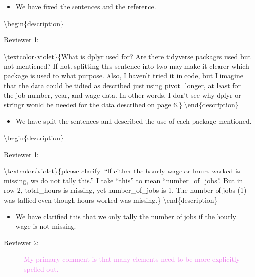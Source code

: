 \documentclass[12pt,a4paper,]{article}
\providecommand{\tightlist}{%
  \setlength{\itemsep}{0pt}\setlength{\parskip}{0pt}}
\begin{document}
\begin{itemize}
\tightlist
\item
  We have fixed the sentences and the reference.
\end{itemize}

\textbackslash begin\{description\}

\item[Reviewer 1:]

\textbackslash textcolor\{violet\}\{What is dplyr used for? Are there tidyverse packages used but not mentioned? If not, splitting this sentence into two may make it clearer which package is used to what purpose. Also, I haven't tried it in code, but I imagine that the data could be tidied as described just using pivot\_longer, at least for the job number, year, and wage data. In other words, I don't see why dplyr or stringr would be needed for the data described on page 6.\}
\textbackslash end\{description\}

\begin{itemize}
\tightlist
\item
  We have split the sentences and described the use of each package mentioned.
\end{itemize}

\textbackslash begin\{description\}

\item[Reviewer 1:]

\textbackslash textcolor\{violet\}\{please clarify. \enquote{If either the hourly wage or hours worked is missing, we do not tally this.} I take \enquote{this} to mean \enquote{number\_of\_jobs}. But in row 2, total\_hours is missing, yet number\_of\_jobs is 1. The number of jobs (1) was tallied even though hours worked was missing.\}
\textbackslash end\{description\}

\begin{itemize}
\tightlist
\item
  We have clarified this that we only tally the number of jobs if the hourly wage is not missing.
\end{itemize}

\begin{description}
\item[Reviewer 2:] \textcolor{violet}{My primary comment is that many elements need to be more explicitly spelled out.}
\end{description}

\printbibliography
\end{document}
